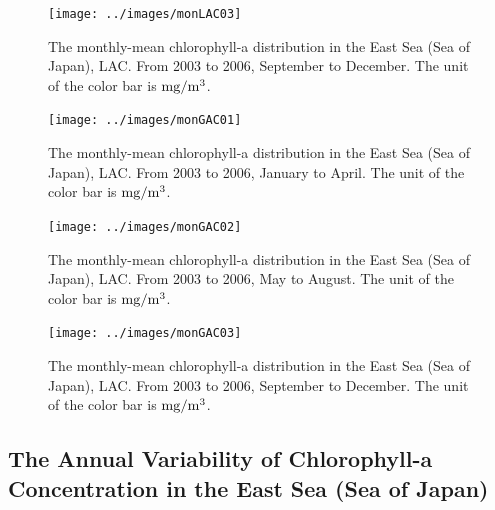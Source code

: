 \begin{figure}[p]
	\centering
	\texttt{[image: ../images/monLAC03]}\\
	\caption{The monthly-mean chlorophyll-a distribution in the East Sea (Sea of Japan), LAC. From 2003 to 2006, September to December. The unit of the color bar is $\rm mg/m^3$.}
	\label{fig:monLAC03}
\end{figure}


\begin{figure}[p]
	\centering
	\texttt{[image: ../images/monGAC01]}\\
	\caption{The monthly-mean chlorophyll-a distribution in the East Sea (Sea of Japan), LAC. From 2003 to 2006, January to April. The unit of the color bar is $\rm mg/m^3$.}
	\label{fig:monGAC01}
\end{figure}


\begin{figure}[p]
	\centering
	\texttt{[image: ../images/monGAC02]}\\
	\caption{The monthly-mean chlorophyll-a distribution in the East Sea (Sea of Japan), LAC. From 2003 to 2006, May to August. The unit of the color bar is $\rm mg/m^3$.}
	\label{fig:monGAC02}
\end{figure}


\begin{figure}[p]
	\centering
	\texttt{[image: ../images/monGAC03]}\\
	\caption{The monthly-mean chlorophyll-a distribution in the East Sea (Sea of Japan), LAC. From 2003 to 2006, September to December. The unit of the color bar is $\rm mg/m^3$.}
	\label{fig:monGAC03}
\end{figure}


\newpage
 
\subsection{The Annual Variability of Chlorophyll-a Concentration in the East Sea (Sea of Japan)}
 


